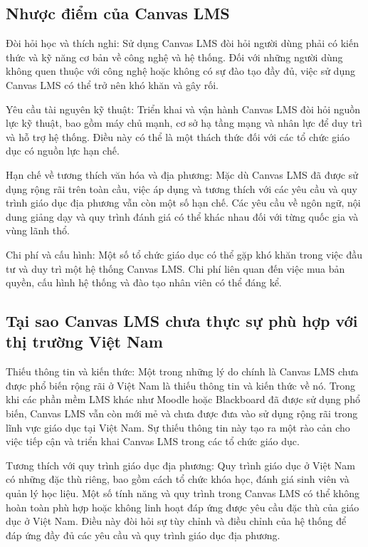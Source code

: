 \documentclass[../Thesis.tex]{subfiles}
\begin{document}
	\subsection{Nhược điểm của Canvas LMS}
		Đòi hỏi học và thích nghi: Sử dụng Canvas LMS đòi hỏi người dùng phải có kiến thức và kỹ năng cơ bản về công nghệ và hệ thống. Đối với những người dùng không quen thuộc với công nghệ hoặc không có sự đào tạo đầy đủ, việc sử dụng Canvas LMS có thể trở nên khó khăn và gây rối.

		Yêu cầu tài nguyên kỹ thuật: Triển khai và vận hành Canvas LMS đòi hỏi nguồn lực kỹ thuật, bao gồm máy chủ mạnh, cơ sở hạ tầng mạng và nhân lực để duy trì và hỗ trợ hệ thống. Điều này có thể là một thách thức đối với các tổ chức giáo dục có nguồn lực hạn chế.
		
		Hạn chế về tương thích văn hóa và địa phương: Mặc dù Canvas LMS đã được sử dụng rộng rãi trên toàn cầu, việc áp dụng và tương thích với các yêu cầu và quy trình giáo dục địa phương vẫn còn một số hạn chế. Các yêu cầu về ngôn ngữ, nội dung giảng dạy và quy trình đánh giá có thể khác nhau đối với từng quốc gia và vùng lãnh thổ.
		
		Chi phí và cấu hình: Một số tổ chức giáo dục có thể gặp khó khăn trong việc đầu tư và duy trì một hệ thống Canvas LMS. Chi phí liên quan đến việc mua bản quyền, cấu hình hệ thống và đào tạo nhân viên có thể đáng kể.

	\subsection{Tại sao Canvas LMS chưa thực sự phù hợp với thị trường Việt Nam}

		Thiếu thông tin và kiến thức: Một trong những lý do chính là Canvas LMS chưa được phổ biến rộng rãi ở Việt Nam là thiếu thông tin và kiến thức về nó. Trong khi các phần mềm LMS khác như Moodle hoặc Blackboard đã được sử dụng phổ biến, Canvas LMS vẫn còn mới mẻ và chưa được đưa vào sử dụng rộng rãi trong lĩnh vực giáo dục tại Việt Nam. Sự thiếu thông tin này tạo ra một rào cản cho việc tiếp cận và triển khai Canvas LMS trong các tổ chức giáo dục.

		Tương thích với quy trình giáo dục địa phương: Quy trình giáo dục ở Việt Nam có những đặc thù riêng, bao gồm cách tổ chức khóa học, đánh giá sinh viên và quản lý học liệu. Một số tính năng và quy trình trong Canvas LMS có thể không hoàn toàn phù hợp hoặc không linh hoạt đáp ứng được yêu cầu đặc thù của giáo dục ở Việt Nam. Điều này đòi hỏi sự tùy chỉnh và điều chỉnh của hệ thống để đáp ứng đầy đủ các yêu cầu và quy trình giáo dục địa phương.
\end{document}
